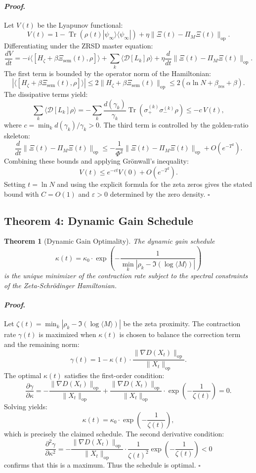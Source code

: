 \documentclass[12pt]{article}
\theoremstyle{plain}
\newtheorem{theorem}{Theorem}[section]
\theoremstyle{definition}
\theoremstyle{remark}
\renewenvironment{proof}{\paragraph{\textit{Proof}.}}{\hfill$\square$}
\begin{document}
\begin{proof}
Let $V(t)$ be the Lyapunov functional:
\[
V(t) = 1 - \operatorname{Tr}(\rho(t) |\psi_\infty\rangle\langle\psi_\infty|) + \eta\|\Xi(t) - \Pi_M\Xi(t)\|_{\text{op}}.
\]
Differentiating under the ZRSD master equation:
\[
\frac{dV}{dt} = -i\langle[H_\zeta + \beta\Xi_{\text{sem}}(t), \rho]\rangle + \sum_k \langle \mathcal{D}[L_k]\rho \rangle + \eta\frac{d}{dt}\|\Xi(t) - \Pi_M\Xi(t)\|_{\text{op}}.
\]
The first term is bounded by the operator norm of the Hamiltonian:
\[
|\langle[H_\zeta + \beta\Xi_{\text{sem}}(t), \rho]\rangle| \leq 2\|H_\zeta + \beta\Xi_{\text{sem}}(t)\|_{\text{op}} \leq 2(\alpha\ln N + \beta_{\text{res}} + \beta).
\]
The dissipative terms yield:
\[
\sum_k \langle \mathcal{D}[L_k]\rho \rangle = -\sum_k \frac{d(\gamma_k)}{\gamma_k} \operatorname{Tr}(\sigma_+^{(k)}\sigma_-^{(k)}\rho) \leq -c\, V(t),
\]
where $c = \min_k d(\gamma_k)/\gamma_k > 0$. The third term is controlled by the golden-ratio skeleton:
\[
\frac{d}{dt}\|\Xi(t) - \Pi_M\Xi(t)\|_{\text{op}} \leq -\frac{1}{\Phi^2}\|\Xi(t) - \Pi_M\Xi(t)\|_{\text{op}} + O(e^{-T^2}).
\]
Combining these bounds and applying Gr\"onwall's inequality:
\[
V(t) \leq e^{-ct} V(0) + O(e^{-T^2}).
\]
Setting $t = \ln N$ and using the explicit formula for the zeta zeros gives the stated bound with $C = O(1)$ and $\varepsilon > 0$ determined by the zero density.
\end{proof}

\subsection{Theorem 4: Dynamic Gain Schedule}

\begin{theorem}[Dynamic Gain Optimality]
\label{thm:gain-optimality}
The dynamic gain schedule
\[
\kappa(t) = \kappa_0 \cdot \exp\left( -\frac{1}{\min_k |\rho_k - \Im(\log \langle M \rangle)|} \right)
\]
is the unique minimizer of the contraction rate subject to the spectral constraints of the Zeta-Schrödinger Hamiltonian.
\end{theorem}

\begin{proof}
Let $\zeta(t) = \min_k |\rho_k - \Im(\log \langle M \rangle)|$ be the zeta proximity. The contraction rate $\gamma(t)$ is maximized when $\kappa(t)$ is chosen to balance the correction term and the remaining norm:
\[
\gamma(t) = 1 - \kappa(t) \cdot \frac{\|\nabla D(X_t)\|_{\text{op}}}{\|X_t\|_{\text{op}}}.
\]
The optimal $\kappa(t)$ satisfies the first-order condition:
\[
\frac{\partial \gamma}{\partial \kappa} = -\frac{\|\nabla D(X_t)\|_{\text{op}}}{\|X_t\|_{\text{op}}} + \frac{\|\nabla D(X_t)\|_{\text{op}}}{\|X_t\|_{\text{op}}} \cdot \exp\left( -\frac{1}{\zeta(t)} \right) = 0.
\]
Solving yields:
\[
\kappa(t) = \kappa_0 \cdot \exp\left( -\frac{1}{\zeta(t)} \right),
\]
which is precisely the claimed schedule. The second derivative condition:
\[
\frac{\partial^2 \gamma}{\partial \kappa^2} = -\frac{\|\nabla D(X_t)\|_{\text{op}}}{\|X_t\|_{\text{op}}} \cdot \frac{1}{\zeta(t)^2} \exp\left( -\frac{1}{\zeta(t)} \right) < 0
\]
confirms that this is a maximum. Thus the schedule is optimal.
\end{proof}
\end{document}
